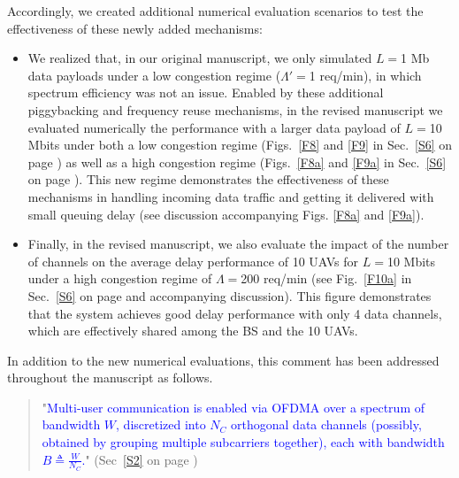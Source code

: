 \documentclass[12pt, draftcls, onecolumn]{IEEEtran}
\theoremstyle{plain}
\theoremstyle{definition}
\theoremstyle{remark}
\newcommand\hlt[1]{\textcolor{blue}{#1}}
\begin{document}
\begin{enumerate}
Accordingly, we created additional numerical evaluation scenarios to test the effectiveness of these newly added mechanisms:
\begin{itemize}
    \item 
We realized that, in our original manuscript, we only simulated $L{=}$1 Mb data payloads under a low congestion regime ($\Lambda'{=}$1 req/min), in which spectrum efficiency was not an issue.
Enabled by these additional piggybacking and frequency reuse mechanisms, in the revised
manuscript we evaluated numerically  the performance with a larger data payload 
 of $L{=}$10 Mbits under both a low congestion regime (Figs.~\ref{F8} and \ref{F9} in Sec.~\ref{S6} on page \pageref{F8}) as well as a high congestion regime (Figs.~\ref{F8a} and \ref{F9a} in Sec.~\ref{S6} on page \pageref{F8a}).
 This new regime demonstrates the effectiveness of these mechanisms in handling incoming data traffic and getting it delivered with small queuing delay (see discussion accompanying Figs. \ref{F8a} and \ref{F9a}).
\item
Finally, in the revised manuscript, we also evaluate
the impact of the number of channels on the average delay performance of 10 UAVs for $L{=}$10 Mbits under a high congestion regime of $\Lambda{=}$200 req/min (see Fig.~\ref{F10a} in Sec.~\ref{S6} on page \pageref{F10a} and accompanying discussion). 
This figure demonstrates that the system achieves good delay performance with only 4 data channels, which are effectively shared among the BS and the 10 UAVs.
\end{itemize}
\vspace{2mm}

In addition to the new numerical evaluations, this comment has been addressed throughout the manuscript as follows.
\begin{quote}
    "\hlt{Multi-user communication is enabled via OFDMA over a spectrum of bandwidth $W$, discretized into $N_{C}$ orthogonal data channels (possibly, obtained by grouping multiple subcarriers together), each with bandwidth $B{\triangleq}\frac{W}{N_{C}}$.}" (Sec~\ref{S2} on page \pageref{S2})
    \vspace{1mm}
    

\end{quote}
\end{enumerate}
\end{document}
